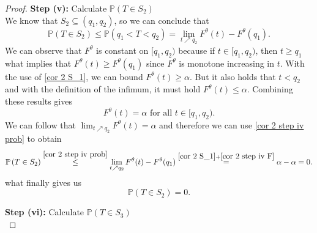 \begin{proof}
	
	\textbf{Step (v):} Calculate $\mathbb{P} \left( T \in S_2 \right)$ \\
	
	We know that $S_2 \subseteq (q_1, q_2)$, so we can conclude that 
	\begin{equation} \label{cor 2 step iv prob}
		\mathbb{P} \left( T \in S_2 \right)
		\leq 
		\mathbb{P} \left( q_1 < T < q_2 \right)
		=
		\lim_{t \nearrow q_2} F^\theta (t) - F^\theta (q_1).
	\end{equation}
	We can observe that $F^\theta$ is constant on $[q_1, q_2)$ because if $t \in [q_1, q_2)$, then $t \geq q_1$ what implies that $F^\theta (t) \geq F^\theta (q_1)$ since $F^\theta$ is monotone increasing in $t$. With the use of \eqref{cor 2 S_1}, we can bound $F^\theta (t) \geq \alpha$. But it also holds that $t < q_2$ and with the definition of the infimum, it must hold $F^\theta (t) \leq \alpha$. Combining these results gives 
	\begin{equation} \label{cor 2 step iv F}
		F^\theta (t) = \alpha \text{ for all } t \in [q_1, q_2).
	\end{equation}
	We can follow that $\lim_{t \nearrow q_2} F^\theta (t) = \alpha$ and therefore we can use \eqref{cor 2 step iv prob} to obtain 
	\begin{equation*}
		\mathbb{P} \left( T \in S_2 \right)
		\overset{\eqref{cor 2 step iv prob}}{\leq}
		\lim_{t \nearrow q_2} F^\theta (t) - F^\theta (q_1)
		\overset{\eqref{cor 2 S_1} + \eqref{cor 2 step iv F}}{=}
		\alpha - \alpha
		=
		0.
	\end{equation*}
	what finally gives us 
	\begin{equation} \label{cor 2 S_2}
		\mathbb{P} \left( T \in S_2 \right) = 0.
	\end{equation}
	
	\textbf{Step (vi):} Calculate $\mathbb{P} \left( T \in S_3 \right)$ \\
	

\end{proof}
